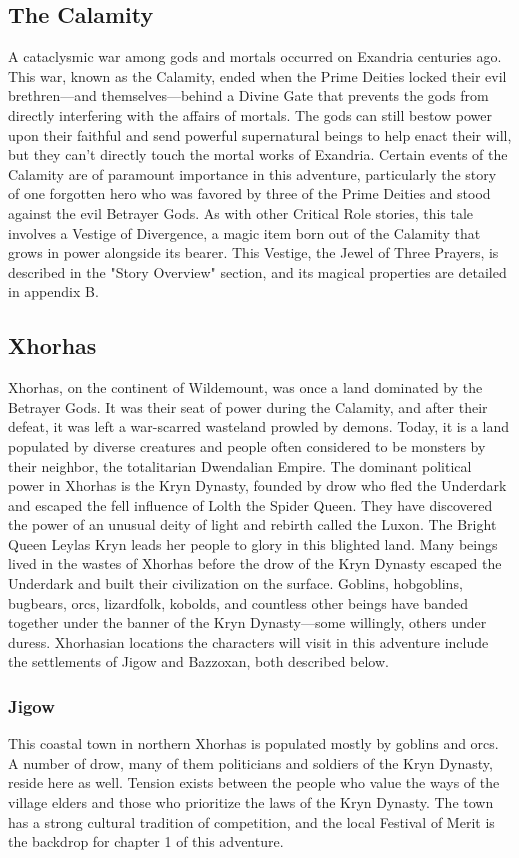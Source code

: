 \documentclass[10pt,a4paper,twoside,bg=print,twocolumn,openany,nodeprecatedcode]{dndbook}
\begin{document}
\subsection{The Calamity}
A cataclysmic war among gods and mortals occurred on Exandria centuries ago. This war, known as the Calamity, ended when the Prime Deities locked their evil brethren—and themselves—behind a Divine Gate that prevents the gods from directly interfering with the affairs of mortals. The gods can still bestow power upon their faithful and send powerful supernatural beings to help enact their will, but they can't directly touch the mortal works of Exandria.
Certain events of the Calamity are of paramount importance in this adventure, particularly the story of one forgotten hero who was favored by three of the Prime Deities and stood against the evil Betrayer Gods. As with other Critical Role stories, this tale involves a Vestige of Divergence, a magic item born out of the Calamity that grows in power alongside its bearer. This Vestige, the Jewel of Three Prayers, is described in the "Story Overview" section, and its magical properties are detailed in appendix B.
\subsection{Xhorhas}
Xhorhas, on the continent of Wildemount, was once a land dominated by the Betrayer Gods. It was their seat of power during the Calamity, and after their defeat, it was left a war-scarred wasteland prowled by demons. Today, it is a land populated by diverse creatures and people often considered to be monsters by their neighbor, the totalitarian Dwendalian Empire. The dominant political power in Xhorhas is the Kryn Dynasty, founded by drow who fled the Underdark and escaped the fell influence of Lolth the Spider Queen. They have discovered the power of an unusual deity of light and rebirth called the Luxon. The Bright Queen Leylas Kryn leads her people to glory in this blighted land.
Many beings lived in the wastes of Xhorhas before the drow of the Kryn Dynasty escaped the Underdark and built their civilization on the surface. Goblins, hobgoblins, bugbears, orcs, lizardfolk, kobolds, and countless other beings have banded together under the banner of the Kryn Dynasty—some willingly, others under duress.
Xhorhasian locations the characters will visit in this adventure include the settlements of Jigow and Bazzoxan, both described below.
\subsubsection{Jigow}
This coastal town in northern Xhorhas is populated mostly by goblins and orcs. A number of drow, many of them politicians and soldiers of the Kryn Dynasty, reside here as well. Tension exists between the people who value the ways of the village elders and those who prioritize the laws of the Kryn Dynasty. The town has a strong cultural tradition of competition, and the local Festival of Merit is the backdrop for chapter 1 of this adventure.
\end{document}
